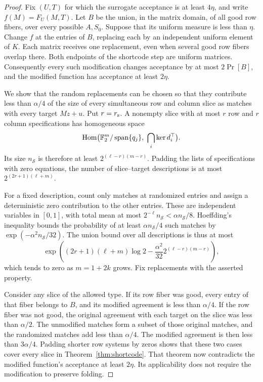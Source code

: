 \begin{proof}
Fix $(U,T)$ for which the surrogate acceptance is at least $4\eta$, and
write $f(M)=F_U(M,T)$.  Let $B$ be the union, in the matrix domain, of all
good row fibers, over every possible $A,S_0$.  Suppose that its uniform
measure is less than $\eta$.  Change $f$ at the entries of $B$, replacing
each by an independent uniform element of $K$.  Each matrix receives one
replacement, even when several good row fibers overlap there.  Both endpoints of the
shortcode step are uniform matrices.  Consequently every such modification
changes acceptance by at most $2\Pr[B]$, and the modified function has
acceptance at least $2\eta$.

We show that the random replacements can be chosen so that they contribute
less than $\alpha/4$ of the size of every simultaneous row and column slice
as matches with every target $Mz+u$.  Put $r=r_{\rm s}$.  A nonempty
slice with at most $r$ row and $r$ column specifications has homogeneous
space
\[
 \operatorname{Hom}\bigl(\mathbb F_2^m/\operatorname{span}\{q_j\},\ \bigcap_i\ker d_i^\top\bigr).
\]
Its size $n_{\mathcal S}$ is therefore at least
$2^{(\ell-r)(m-r)}$.  Padding the lists of specifications with zero
equations, the number of slice--target descriptions is at most
$2^{(2r+1)(\ell+m)}$.

For a fixed description, count only matches at randomized entries and
assign a deterministic zero contribution to the other entries.  These are
independent variables in $[0,1]$, with total mean at most
$2^{-\ell}n_{\mathcal S}<\alpha n_{\mathcal S}/8$.  Hoeffding's
inequality \cite[Theorem~2, equation~(2.6)]{Hoeffding1963} bounds the
probability of at least
$\alpha n_{\mathcal S}/4$ such matches by
$\exp(-\alpha^2 n_{\mathcal S}/32)$.  The union bound over all
descriptions is thus at most
\[
 \exp\left((2r+1)(\ell+m)\log2
       -\frac{\alpha^2}{32}2^{(\ell-r)(m-r)}\right),
\]
which tends to zero as $m=1+2k$ grows.  Fix replacements with the asserted
property.

Consider any slice of the allowed type.  If its row fiber was good, every
entry of that fiber belongs to $B$, and its modified agreement is less
than $\alpha/4$.  If the row fiber was not good, the original agreement
with each target on the slice was less than $\alpha/2$.  The unmodified
matches form a subset of those original matches, and the randomized
matches add less than $\alpha/4$.  The modified agreement is then less
than $3\alpha/4$.  Padding shorter row systems by zeros shows that these
two cases cover every slice in Theorem~\ref{thm:shortcode}.  That theorem
now contradicts the modified function's acceptance at least $2\eta$.
Its applicability does not require the modification to preserve folding.


\end{proof}
